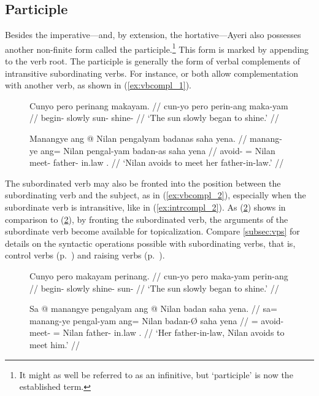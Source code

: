 \subsection{Participle}
\label{subsec:participle}
Besides the imperative---and, by extension, the hortative---Ayeri also
possesses another non-finite form called the participle.\footnote{It might as
well be referred to as an infinitive, but `participle' is now the established
term.} This form is marked by appending  to the verb root. The
participle is generally the form of verbal complements of intransitive
subordinating verbs. For instance,  or
 both allow complementation with another verb, as
shown in (\ref{ex:vbcompl_1}).

\begin{figure}[h]
\pex\label{ex:vbcompl_1}
\a\label{ex:intrcompl_1}\begingl
	\gla Cunyo pero perinang makayam. // 
	\glb cun-yo pero perin-ang maka-yam // 
	\glc begin-\TsgN{} slowly sun-\Aarg{} shine-\Ptcp{} //
	\glft `The sun slowly began to shine.' //
\endgl

\a\label{ex:trcompl_1}\begingl
	\gla Manangye ang @ Nilan pengalyam badanas saha yena. //
	\glb manang-ye ang= Nilan pengal-yam badan-as saha yena //
	\glc avoid-\TsgF{} \Aarg{}= Nilan meet-\Ptcp{} father-\Parg{} in.law 
		\TsgF{}.\Gen{} //
	\glft `Nilan avoids to meet her father-in-law.' //
\endgl
\xe
\end{figure}

The subordinated verb may also be fronted into the position between the
subordinating verb and the subject, as in (\ref{ex:vbcompl_2}), especially when
the subordinate verb is intransitive, like  in
(\ref{ex:intrcompl_2}). As (\ref{ex:trcompl_2}) shows in comparison to
(\ref{ex:trcompl_2}), by fronting the subordinated verb, the arguments of the
subordinate verb become available for topicalization. Compare
\autoref{subsec:vps} for details on the syntactic operations possible with
subordinating verbs, that is, control verbs (p.~\pageref{subsubsec:ctrlvb}) and
raising verbs (p.~\pageref{subsubsec:raisvb}).

\begin{figure}[h]
\pex\label{ex:vbcompl_2}
\a\label{ex:intrcompl_2}\begingl
	\gla Cunyo pero makayam perinang. // 
	\glb cun-yo pero maka-yam perin-ang // 
	\glc begin-\TsgN{} slowly shine-\Ptcp{} sun-\Aarg{} //
	\glft `The sun slowly began to shine.' //
\endgl

\a\label{ex:trcompl_2}\begingl
	\gla Sa @ manangye pengalyam ang @ Nilan badan saha yena. //
	\glb sa= manang-ye pengal-yam ang= Nilan badan-Ø saha yena //
	\glc \PatT{}= avoid-\TsgF{} meet-\Ptcp{} \Aarg{}= Nilan father-\Parg{}
		in.law \TsgF{}.\Gen{} //
	\glft `Her father-in-law, Nilan avoids to meet him.' //
\endgl
\xe
\end{figure}

